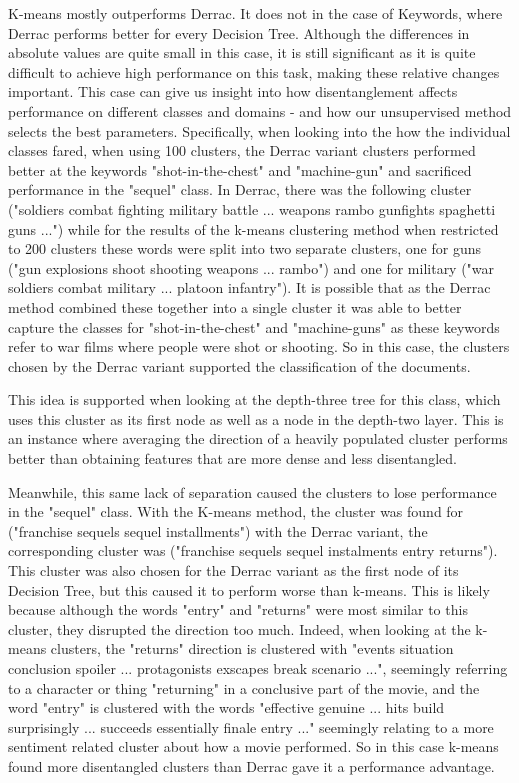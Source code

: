 K-means mostly outperforms Derrac. It does not in the case of Keywords, where Derrac performs better for every Decision Tree. Although the differences in absolute values are quite small in this case, it is still significant as it is quite difficult to achieve high performance on this task, making these relative changes important. This case can give us insight into how disentanglement affects performance on different classes and domains - and how our unsupervised method selects the best parameters.  Specifically, when looking into the how the individual classes fared, when using 100 clusters, the Derrac variant clusters performed better at the keywords "shot-in-the-chest" and "machine-gun" and sacrificed performance in the "sequel" class. In Derrac, there was the following cluster ("soldiers combat fighting military battle ... weapons rambo gunfights spaghetti guns ...") while for the results of the k-means clustering method when restricted to 200 clusters these words were split into two separate clusters, one for guns ("gun explosions shoot shooting weapons ... rambo") and one for military ("war soldiers combat military ... platoon infantry"). It is possible that as the Derrac method combined these together into a single cluster it was able to better capture the classes for "shot-in-the-chest" and "machine-guns" as these keywords refer to war films where people were shot or shooting. So in this case, the clusters chosen by the  Derrac variant supported the classification of the documents. 

This idea is supported when looking at the depth-three tree for this class, which uses this cluster as its first node as well as a node in the depth-two layer. This is an instance where averaging the direction of  a heavily populated cluster  performs better than obtaining features that are more dense and less disentangled. 





Meanwhile, this same lack of separation caused the clusters to lose performance in the "sequel" class. With the K-means method, the cluster was found for ("franchise sequels sequel installments") with the Derrac variant, the corresponding cluster was ("franchise sequels sequel instalments entry returns"). This cluster was also chosen for the Derrac variant as the first node of its Decision Tree, but this caused it to perform worse than k-means. This is likely because although the words "entry" and "returns" were most similar to this cluster, they disrupted the direction too much. Indeed, when looking at the k-means clusters, the "returns" direction is clustered with "events situation conclusion spoiler ... protagonists exscapes break scenario ...", seemingly referring to a character or thing "returning" in a conclusive part of the movie, and the word "entry" is clustered with the words "effective genuine ... hits build surprisingly ... succeeds essentially finale entry ..." seemingly relating to a more sentiment related cluster about how a movie performed. So in this case k-means found more disentangled clusters than Derrac gave it a performance advantage. 


